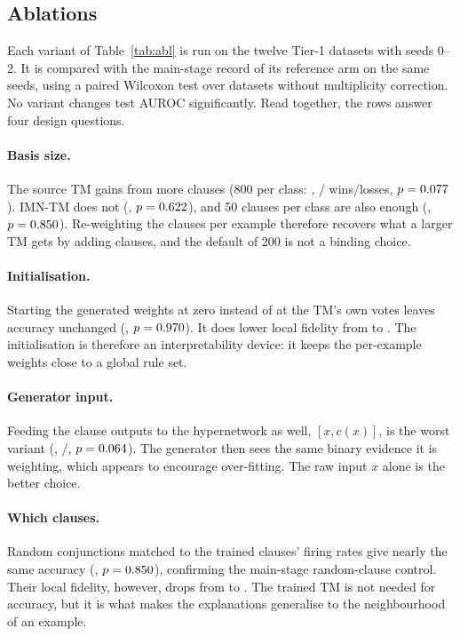 \subsection{Ablations}\label{sec:abl}
Each variant of Table~\ref{tab:abl} is run on the twelve Tier-1 datasets with seeds 0--2. It is
compared with the main-stage record of its reference arm on the same seeds, using a paired
Wilcoxon test over datasets without multiplicity correction. No variant changes test AUROC
significantly. Read together, the rows answer four design questions.

\paragraph{Basis size.} The source TM gains from more clauses (800 per class:
\AblTmEightMean, \AblTmEightWins/\AblTmEightLosses{} wins/losses, $p=0.077$). IMN-TM
does not (\AblImntmEightMean, $p=0.622$), and 50 clauses per class are also enough
(\AblImntmFiftyMean, $p=0.850$). Re-weighting the clauses per example therefore
recovers what a larger TM gets by adding clauses, and the default of 200 is not a binding choice.

\paragraph{Initialisation.} Starting the generated weights at zero instead of at the TM's own
votes leaves accuracy unchanged (\AblNoinitMean, $p=0.970$). It does lower local fidelity
from \AblNoinitRefFid{} to \AblNoinitFid. The initialisation is therefore an interpretability
device: it keeps the per-example weights close to a global rule set.

\paragraph{Generator input.} Feeding the clause outputs to the hypernetwork as well,
$[x, c(x)]$, is the worst variant (\AblXcMean, \AblXcWins/\AblXcLosses, $p=0.064$). The
generator then sees the same binary evidence it is weighting, which appears to encourage
over-fitting. The raw input $x$ alone is the better choice.

\paragraph{Which clauses.} Random conjunctions matched to the trained clauses' firing rates give
nearly the same accuracy (\AblRandfrMean, $p=0.850$), confirming the main-stage
random-clause control. Their local fidelity, however, drops from \AblRandfrRefFid{} to
\AblRandfrFid. The trained TM is not needed for accuracy, but it is what makes the explanations
generalise to the neighbourhood of an example.


